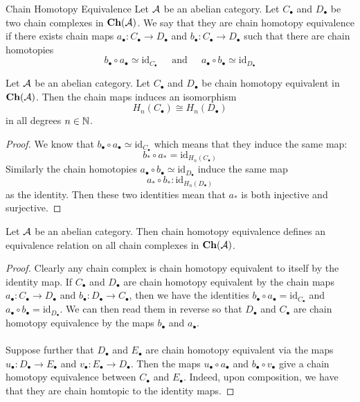 \documentclass[a4paper]{article}
\begin{document}
\begin{defn}{Chain Homotopy Equivalence}{} Let $\mathcal{A}$ be an abelian category. Let $C_\bullet$ and $D_\bullet$ be two chain complexes in $\bold{Ch}(\mathcal{A})$. We say that they are chain homotopy equivalence if there exists chain maps $a_\bullet:C_\bullet\to D_\bullet$ and $b_\bullet:C_\bullet\to D_\bullet$ such that there are chain homotopies $$b_\bullet\circ a_\bullet\simeq\text{id}_{C_\bullet}\;\;\;\;\text{ and }\;\;\;\;a_\bullet\circ b_\bullet\simeq\text{id}_{D_\bullet}$$
\end{defn}

\begin{lmm}{}{} Let $\mathcal{A}$ be an abelian category. Let $C_\bullet$ and $D_\bullet$ be chain homotopy equivalent in $\bold{Ch}(\mathcal{A})$. Then the chain maps induces an isomorphism $$H_n(C_\bullet)\cong H_n(D_\bullet)$$ in all degrees $n\in\mathbb{N}$. \tcbline
\begin{proof}
We know that $b_\bullet\circ a_\bullet\simeq\text{id}_{C_\bullet}$ which means that they induce the same map: $$b_\ast\circ a_\ast=\text{id}_{H_n(C_\bullet)}$$ Similarly the chain homotopies $a_\bullet\circ b_\bullet\simeq\text{id}_{D_\bullet}$ induce the same map $$a_\ast\circ b_\ast:\text{id}_{H_n(D_\bullet)}$$ as the identity. Then these two identities mean that $a_\ast$ is both injective and surjective. 
\end{proof}
\end{lmm}

\begin{prp}{}{} Let $\mathcal{A}$ be an abelian category. Then chain homotopy equivalence defines an equivalence relation on all chain complexes in $\bold{Ch}(\mathcal{A})$. \tcbline
\begin{proof}
Clearly any chain complex is chain homotopy equivalent to itself by the identity map. If $C_\bullet$ and $D_\bullet$ are chain homotopy equivalent by the chain maps $a_\bullet:C_\bullet\to D_\bullet$ and $b_\bullet:D_\bullet\to C_\bullet$, then we have the identities $b_\bullet\circ a_\bullet=\text{id}_{C_\bullet}$ and $a_\bullet\circ b_\bullet=\text{id}_{D_\bullet}$. We can then read them in reverse so that $D_\bullet$ and $C_\bullet$ are chain homotopy equivalence by the maps $b_\bullet$ and $a_\bullet$. \\~\\

Suppose further that $D_\bullet$ and $E_\bullet$ are chain homotopy equivalent via the maps $u_\bullet:D_\bullet\to E_\bullet$ and $v_\bullet:E_\bullet\to D_\bullet$. Then the maps $u_\bullet\circ a_\bullet$ and $b_\bullet\circ v_\bullet$ give a chain homotopy equivalence between $C_\bullet$ and $E_\bullet$. Indeed, upon composition, we have that they are chain  homtopic to the identity maps. 
\end{proof}
\end{prp}
\end{document}
